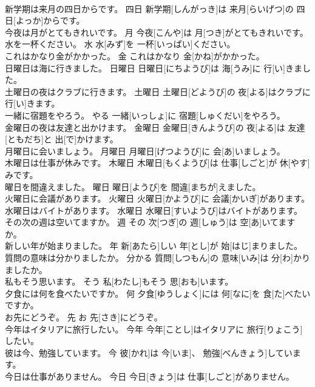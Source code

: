 \documentclass[8pt]{extreport}
\begin{document}
\begin{CJK}{UTF8}{min}
\\	新学期は来月の四日からです。	四日	新学期[しんがっき]は 来月[らいげつ]の 四日[よっか]からです。	
\\	今夜は月がとてもきれいです。	月	今夜[こんや]は 月[つき]がとてもきれいです。	
\\	水を一杯ください。	水	水[みず]を 一杯[いっぱい]ください。	
\\	これはかなり金がかかった。	金	これはかなり 金[かね]がかかった。	
\\	日曜日は海に行きました。	日曜日	日曜日[にちようび]は 海[うみ]に 行[い]きました。	
\\	土曜日の夜はクラブに行きます。	土曜日	土曜日[どようび]の 夜[よる]はクラブに 行[い]きます。	
\\	一緒に宿題をやろう。	やる	一緒[いっしょ]に 宿題[しゅくだい]をやろう。	
\\	金曜日の夜は友達と出かけます。	金曜日	金曜日[きんようび]の 夜[よる]は 友達[ともだち]と 出[で]かけます。	
\\	月曜日に会いましょう。	月曜日	月曜日[げつようび]に 会[あ]いましょう。	
\\	木曜日は仕事が休みです。	木曜日	木曜日[もくようび]は 仕事[しごと]が 休[やす]みです。	
\\	曜日を間違えました。	曜日	曜日[ようび]を 間違[まちが]えました。	
\\	火曜日に会議があります。	火曜日	火曜日[かようび]に 会議[かいぎ]があります。	
\\	水曜日はバイトがあります。	水曜日	水曜日[すいようび]はバイトがあります。	
\\	その次の週は空いてますか。	週	その 次[つぎ]の 週[しゅう]は 空[あ]いてますか。	
\\	新しい年が始まりました。	年	新[あたら]しい 年[とし]が 始[はじ]まりました。	
\\	質問の意味は分かりましたか。	分かる	質問[しつもん]の 意味[いみ]は 分[わ]かりましたか。	
\\	私もそう思います。	そう	私[わたし]もそう 思[おも]います。	
\\	夕食には何を食べたいですか。	何	夕食[ゆうしょく]には 何[なに]を 食[た]べたいですか。	
\\	お先にどうぞ。	先	お 先[さき]にどうぞ。	
\\	今年はイタリアに旅行したい。	今年	今年[ことし]はイタリアに 旅行[りょこう]したい。	
\\	彼は今、勉強しています。	今	彼[かれ]は 今[いま]、 勉強[べんきょう]しています。	
\\	今日は仕事がありません。	今日	今日[きょう]は 仕事[しごと]がありません。	

\end{CJK}
\end{document}
